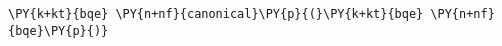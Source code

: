 \begin{Verbatim}[commandchars=\\\{\}]
    \PY{k+kt}{bqe} \PY{n+nf}{canonical}\PY{p}{(}\PY{k+kt}{bqe} \PY{n+nf}{bqe}\PY{p}{)}
\end{Verbatim}
